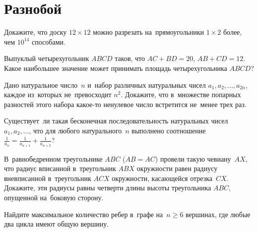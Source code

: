 
\section*{Разнобой}


\begin{problems}

\item
Докажите, что доску $12 \times 12$ можно разрезать на~прямоугольники
$1 \times 2$ более, чем $10^{14}$ способами.

\item
Выпуклый четырехугольник $ABCD$ таков, что $AC + BD = 20$, $AB + CD = 12$.
Какое наибольшее значение может принимать площадь четырехугольника $ABCD$?

\item
Дано натуральное число~$n$ и~набор различных натуральных чисел
$a_1, a_2, \ldots, a_{2n}$, каждое из~которых не~превосходит $n^2$.
Докажите, что в~множестве попарных разностей этого набора какое-то ненулевое
число встретится не~менее трех раз.

\item
Существует~ли такая бесконечная последовательность натуральных чисел
$a_1, a_2, \ldots$, что для любого натурального~$n$ выполнено соотношение
\(
    \frac{1}{a_{n}}
=
    \frac{1}{a_{n+1}} + \frac{1}{a_{n+2}}
\)?

\item
В~равнобедренном треугольнике $ABC$ ($AB = AC$) провели такую чевиану~$AX$, что
радиус вписанной в~треугольник $ABX$ окружности равен радиусу вневписанной
в~треугольник $ACX$ окружности, касающейся отрезка~$CX$.
Докажите, эти радиусы равны четверти длины высоты треугольника $ABC$, опущенной
на~боковую сторону.

\item
Найдите максимальное количество ребер в~графе на~$n \geq 6$ вершинах, где любые
два цикла имеют общую вершину.

\end{problems}

